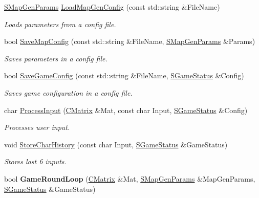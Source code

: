 \begin{DoxyCompactItemize}
\item 
\hyperlink{struct_chase_game_1_1_s_map_gen_params}{S\-Map\-Gen\-Params} \hyperlink{namespace_chase_game_a9c5b5d91cb4251cae461faa4ace8a0cf}{Load\-Map\-Gen\-Config} (const std\-::string \&File\-Name)
\begin{DoxyCompactList}\small\item\em Loads parameters from a config file. \end{DoxyCompactList}\item 
bool \hyperlink{namespace_chase_game_a4c62f61c6aac5bf06292aa51294fd211}{Save\-Map\-Config} (const std\-::string \&File\-Name, \hyperlink{struct_chase_game_1_1_s_map_gen_params}{S\-Map\-Gen\-Params} \&Params)
\begin{DoxyCompactList}\small\item\em Saves parameters in a config file. \end{DoxyCompactList}\item 
bool \hyperlink{namespace_chase_game_a561c85a018e34c8baa21f7f500a3c9c7}{Save\-Game\-Config} (const std\-::string \&File\-Name, \hyperlink{struct_chase_game_1_1_s_game_status}{S\-Game\-Status} \&Config)
\begin{DoxyCompactList}\small\item\em Saves game configuration in a config file. \end{DoxyCompactList}\item 
char \hyperlink{namespace_chase_game_ab5112517855da810fe3b7bdb81d58484}{Process\-Input} (\hyperlink{namespace_chase_game_a469449f9237e59efce3982127366c550}{C\-Matrix} \&Mat, const char Input, \hyperlink{struct_chase_game_1_1_s_game_status}{S\-Game\-Status} \&Config)
\begin{DoxyCompactList}\small\item\em Processes user input. \end{DoxyCompactList}\item 
void \hyperlink{namespace_chase_game_a4b28a3a3594d145b0ce1d1bf179e88a3}{Store\-Char\-History} (const char Input, \hyperlink{struct_chase_game_1_1_s_game_status}{S\-Game\-Status} \&Game\-Status)
\begin{DoxyCompactList}\small\item\em Stores last 6 inputs. \end{DoxyCompactList}\item 
\hypertarget{namespace_chase_game_acb136d1f2b7073d2dc61bc2e2d65b931}{bool {\bfseries Game\-Round\-Loop} (\hyperlink{namespace_chase_game_a469449f9237e59efce3982127366c550}{C\-Matrix} \&Mat, \hyperlink{struct_chase_game_1_1_s_map_gen_params}{S\-Map\-Gen\-Params} \&Map\-Gen\-Params, \hyperlink{struct_chase_game_1_1_s_game_status}{S\-Game\-Status} \&Game\-Status)}\label{namespace_chase_game_acb136d1f2b7073d2dc61bc2e2d65b931}


\end{DoxyCompactItemize}
